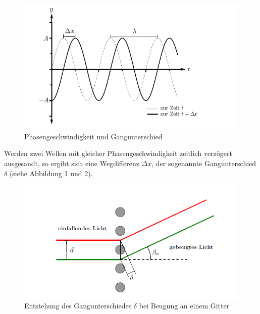 \documentclass[12pt,a4paper,titlepage,headinclude,bibtotoc]{scrartcl}
\begin{document}
\begin{figure} [h]
\begin{center}
\includegraphics[scale=0.75]{Phasengeschwindigkeit2.png} \end{center}
\caption {Phasengeschwindigkeit und Gangunterschied }
\end{figure}

Werden zwei Wellen mit gleicher Phasengeschwindigkeit zeitlich verzögert ausgesandt, so ergibt sich eine Wegdifferenz $\Delta x$, der sogenannte Gangunterschied $\delta$  (siehe Abbildung 1 und 2). 

\begin{figure} [h!]
\begin{center}
\includegraphics[scale=0.65]{Gangunterschied.png} \end{center}
\caption {Entstehung des Gangunterschiedes $\delta$ bei Beugung an einem Gitter }
\end{figure}
\end{document}

